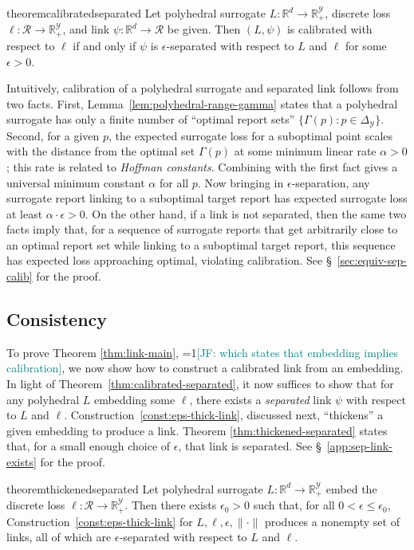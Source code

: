 \documentclass[11pt]{article}
\newcommand{\restatehack}[1]{}   %
\newcommand{\Comments}{1}
\newcommand{\mynote}[2]{\ifnum\Comments=1\textcolor{#1}{#2}\fi}
\newcommand{\jessie}[1]{\mynote{teal}{[JF: #1]}}
\newcommand{\reals}{\mathbb{R}}
\newcommand{\simplex}{\Delta_\Y}
\newcommand{\R}{\mathcal{R}}
\newcommand{\Y}{\mathcal{Y}}
\newtheorem{theorem}{Theorem}
\begin{document}
\begin{restatable}{theorem}{calibratedseparated} \label{thm:calibrated-separated}
  Let polyhedral surrogate $L:\reals^d \to \reals^\Y_+$, discrete loss $\ell:\R\to\reals^\Y_+$, and link $\psi:\reals^d\to\R$ be given.
  Then $(L,\psi)$ is calibrated with respect to $\ell$ if and only if
  $\psi$ is $\epsilon$-separated with respect to $L$ and $\ell$ for some
  $\epsilon>0$.
\end{restatable}
Intuitively, calibration of a polyhedral surrogate and separated link follows from two facts.
First, Lemma~\ref{lem:polyhedral-range-gamma} states that a polyhedral surrogate has only a finite number of ``optimal report sets'' $\{\Gamma(p) : p \in \simplex\}$.
Second, for a given $p$, the expected surrogate loss for a suboptimal point scales with the distance from the optimal set $\Gamma(p)$ at some minimum linear rate $\alpha > 0$; this rate is related to \emph{Hoffman constants}.
Combining with the first fact gives a universal minimum constant $\alpha$ for all $p$.
Now bringing in $\epsilon$-separation, any surrogate report linking to a suboptimal target report has expected surrogate loss at least $\alpha \cdot \epsilon > 0$.
On the other hand, if a link is not separated, then the same two facts imply that, for a sequence of surrogate reports that get arbitrarily close to an optimal report set while linking to a suboptimal target report, this sequence has expected loss approaching optimal, violating calibration.
See \S~\ref{sec:equiv-sep-calib} for the proof.

\subsection{Consistency}

\restatehack{
  \begin{theorem}
    \label{thm:calibrated-separated}
    \label{thm:thickened-separated}
  \end{theorem}}

To prove Theorem \ref{thm:link-main}, \jessie{which states that embedding implies calibration}, we now show how to construct a calibrated link from an embedding.
In light of Theorem~\ref{thm:calibrated-separated}, it now suffices to show that for any polyhedral $L$ embedding some $\ell$, there exists a \emph{separated} link $\psi$ with respect to $L$ and $\ell$.
Construction~\ref{const:eps-thick-link}, discussed next, ``thickens'' a given embedding to produce a link.
Theorem \ref{thm:thickened-separated} states that, for a small enough choice of $\epsilon$, that link is separated.
See \S~\ref{app:sep-link-exists} for the proof.
\begin{restatable}{theorem}{thickenedseparated} \label{thm:thickened-separated}
  Let polyhedral surrogate $L:\reals^d \to \reals^\Y_+$ embed the discrete loss $\ell:\R\to\reals^\Y_+$.
  Then there exists $\epsilon_0 > 0$ such that, for all $0 < \epsilon \leq \epsilon_0$, Construction~\ref{const:eps-thick-link} for $L,\ell,\epsilon,\|\cdot\|$ produces a nonempty set of links, all of which are $\epsilon$-separated with respect to $L$ and $\ell$.
\end{restatable}
\end{document}
